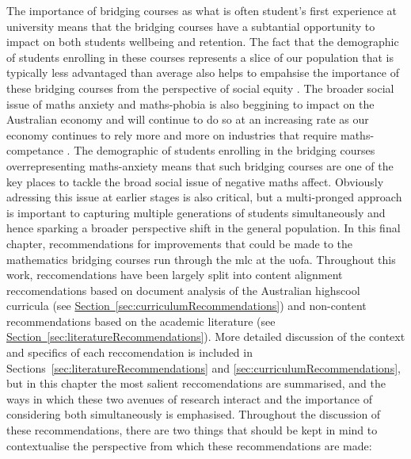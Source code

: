\documentclass[twoside,12pt,a4paper]{report}
\newcommand{\refsec}[1]{\hyperref[sec:#1]{Section~\ref{sec:#1}}}
\begin{document}
The importance of bridging courses as what is often student's first experience at university means that the bridging courses have a subtantial opportunity to impact on both students wellbeing and retention. The fact that the demographic of students enrolling in these courses represents a slice of our population that is typically less advantaged than average also helps to empahsise the importance of these bridging courses from the perspective of social equity \cite{Lee2008}. The broader social issue of maths anxiety and maths-phobia is also beggining to impact on the Australian economy and will continue to do so at an increasing rate as our economy continues to rely more and more on industries that require maths-competance \cite{King2015, Gordon2013}. The demographic of students enrolling in the bridging courses overrepresenting maths-anxiety means that such bridging courses are one of the key places to tackle the broad social issue of negative maths affect. Obviously adressing this issue at earlier stages is also critical, but a multi-pronged approach is important to capturing multiple generations of students simultaneously and hence sparking a broader perspective  shift in the general population. In this final chapter, recommendations for improvements that could be made to the mathematics bridging courses run through the \gls{mlc} at the \gls{uofa}. Throughout this work, reccomendations have been largely split into content alignment reccomendations based on document analysis of the Australian highscool curricula (see \refsec{curriculumRecommendations}) and non-content recommendations based on the academic literature (see \refsec{literatureRecommendations}). More detailed discussion of the context and specifics of each reccomendation is included in Sections~\ref{sec:literatureRecommendations} and \ref{sec:curriculumRecommendations}, but in this chapter the most salient reccomendations are summarised, and the ways in which these two avenues of research interact and the importance of considering both simultaneously is emphasised. Throughout the discussion of these recommendations, there are two things that should be kept in mind to contextualise the perspective from which these recommendations are made:
\end{document}
